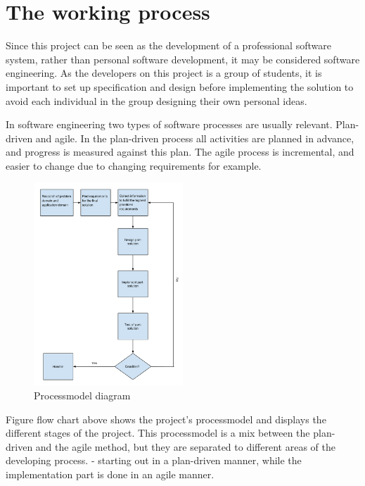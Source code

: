 \chapter{The working process}
Since this project can be seen as the development of a professional software system, rather than personal software development, it may be considered software engineering. As the developers on this project is a group of students, it is important to set up specification and design before implementing the solution to avoid each individual in the group designing their own personal ideas.

In software engineering two types of software processes are usually relevant. Plan-driven and agile. In the plan-driven process all activities are planned in advance, and progress is measured against this plan. The agile process is incremental, and easier to change due to changing requirements for example.

\begin{figure}[h!]
\centering
\includegraphics[width=0.5\textwidth]{figures/ProcessmodelDiagram.png}
\caption{Processmodel diagram}
\label{fig:processmodelDiagram}
\end{figure}

Figure  flow chart above shows the project's processmodel and displays the different stages of the project. This processmodel is a mix between the plan-driven and the agile method, but they are separated to different areas of the developing process. - starting out in a plan-driven manner, while the implementation part is done in an agile manner.

